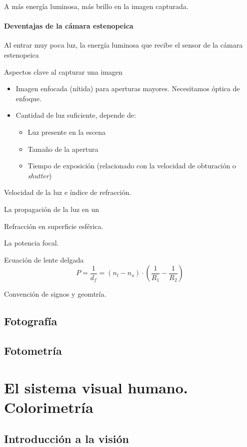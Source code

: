 \documentclass[a4paper]{book}
\begin{document}
A más energía luminosa, más brillo en la imagen capturada.

\subsubsection{Deventajas de la cámara estenopeica}

Al entrar muy poca luz, la energía luminosa que recibe el sensor de la cámara estenopeica

Aspectos clave al capturar una imagen
\begin{itemize}
	\item Imagen enfocada (nítida) para aperturas mayores. Necesitamos óptica de enfoque.
	\item Cantidad de luz suficiente, depende de:
	      \begin{itemize}
		      \item Luz presente en la escena
		      \item Tamaño de la apertura
		      \item Tiempo de exposición (relacionado con la velocidad de obturación o \textit{shutter})
	      \end{itemize}
\end{itemize}

Velocidad de la luz e índice de refracción.

La propagación de la luz en un

Refracción en superficie esférica.

La potencia focal.

Ecuación de lente delgada
\[ P=\frac{1}{d_f}=\left( n_l-n_o \right) \cdot \left( \frac{1}{R_1} - \frac{1}{R_2}  \right)  \]

Convención de signos y geomtría.

\section{Fotografía}

\section{Fotometría}

\chapter{El sistema visual humano. Colorimetría}
\section{Introducción a la visión}
\end{document}
